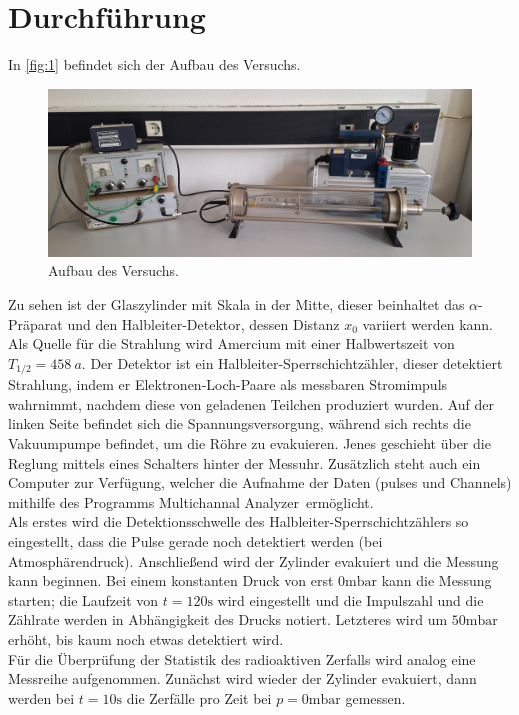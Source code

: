\section{Durchführung}
\label{sec:Durchführung}

In \autoref{fig:1} befindet sich der Aufbau des Versuchs.
\begin{figure}[H]
    \centering
        \centering
        \includegraphics[width=\textwidth]{bilder/versuch.jpg}
        \caption{Aufbau des Versuchs.}
    \hfill
    \label{fig:1}
\end{figure}
\noindent Zu sehen ist der Glaszylinder mit Skala in der Mitte, dieser beinhaltet 
das $\alpha$-Präparat und den Halbleiter-Detektor, dessen Distanz $x_0$ variiert 
werden kann. Als Quelle für die Strahlung wird Amercium mit einer Halbwertszeit 
von $T_{1/2} = \SI{458}{a}$. Der Detektor ist ein Halbleiter-Sperrschichtzähler, 
dieser detektiert Strahlung, indem er Elektronen-Loch-Paare als messbaren 
Stromimpuls wahrnimmt, nachdem diese von geladenen Teilchen produziert wurden. 
Auf der linken Seite befindet sich die Spannungsversorgung, während sich rechts 
die Vakuumpumpe befindet, um die Röhre zu evakuieren. Jenes geschieht über 
die Reglung mittels eines Schalters hinter der Messuhr. Zusätzlich steht auch 
ein Computer zur Verfügung, welcher die Aufnahme der Daten (pulses und Channels)
mithilfe des Programms \glqq Multichannal Analyzer\grqq \, ermöglicht.
\vspace{0.5em}
\\
\noindent Als erstes wird die Detektionsschwelle des Halbleiter-Sperrschichtzählers 
so eingestellt, dass die Pulse gerade noch detektiert werden (bei Atmosphärendruck). 
Anschließend wird der Zylinder evakuiert und 
die Messung kann beginnen. Bei einem konstanten Druck von erst $0 \unit{\milli\bar}$
kann die Messung starten; die Laufzeit von $t = 120 \unit{\second}$ wird eingestellt 
und die Impulszahl und die Zählrate werden in Abhängigkeit des Drucks notiert. 
Letzteres wird um $50 \unit{\milli\bar}$ erhöht, bis kaum noch etwas detektiert 
wird.
\vspace{0.5em}
\\
\noindent Für die Überprüfung der Statistik des radioaktiven Zerfalls wird 
analog eine Messreihe aufgenommen. Zunächst wird wieder der Zylinder evakuiert, 
dann werden bei $t = 10 \unit{\second}$ die Zerfälle pro Zeit bei $p = 0 \unit{\milli\bar}$
gemessen.
